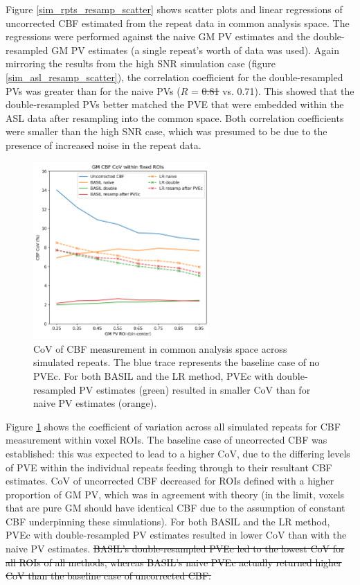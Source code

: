 \documentclass[12pt]{report}
\providecommand{\DIFaddtex}[1]{{\protect\color{blue}\uwave{#1}}} %
\providecommand{\DIFdeltex}[1]{{\protect\color{red}\sout{#1}}}                      %
\providecommand{\DIFaddbegin}{} %
\providecommand{\DIFaddend}{} %
\providecommand{\DIFdelbegin}{} %
\providecommand{\DIFdelend}{} %
\providecommand{\DIFadd}[1]{\texorpdfstring{\DIFaddtex{#1}}{#1}} %
\providecommand{\DIFdel}[1]{\texorpdfstring{\DIFdeltex{#1}}{}} %
\newcommand{\DIFscaledelfig}{0.5}
\newlength{\DIFdelgraphicswidth} %
\newlength{\DIFdelgraphicsheight} %
\newcommand{\DIFaddincludegraphics}[2][]{{\color{blue}\fbox{\DIFOincludegraphics[#1]{#2}}}} %
\newcommand{\DIFdelincludegraphics}[2][]{%
\sbox{\DIFdelgraphicsbox}{\DIFOincludegraphics[#1]{#2}}%
\settoboxwidth{\DIFdelgraphicswidth}{\DIFdelgraphicsbox} %
\settoboxtotalheight{\DIFdelgraphicsheight}{\DIFdelgraphicsbox} %
\scalebox{\DIFscaledelfig}{%
\parbox[b]{\DIFdelgraphicswidth}{\usebox{\DIFdelgraphicsbox}\\[-\baselineskip] \rule{\DIFdelgraphicswidth}{0em}}\llap{\resizebox{\DIFdelgraphicswidth}{\DIFdelgraphicsheight}{%
\setlength{\unitlength}{\DIFdelgraphicswidth}%
\begin{picture}(1,1)%
\thicklines\linethickness{2pt} %
{\color[rgb]{1,0,0}\put(0,0){\framebox(1,1){}}}%
{\color[rgb]{1,0,0}\put(0,0){\line( 1,1){1}}}%
{\color[rgb]{1,0,0}\put(0,1){\line(1,-1){1}}}%
\end{picture}%
}\hspace*{3pt}}} %
} %
\DeclareRobustCommand{\DIFaddbegin}{\DIFOaddbegin \let\includegraphics\DIFaddincludegraphics} %
\DeclareRobustCommand{\DIFaddend}{\DIFOaddend \let\includegraphics\DIFOincludegraphics} %
\DeclareRobustCommand{\DIFdelbegin}{\DIFOdelbegin \let\includegraphics\DIFdelincludegraphics} %
\DeclareRobustCommand{\DIFdelend}{\DIFOaddend \let\includegraphics\DIFOincludegraphics} %
\begin{document}
Figure \ref{sim_rpts_resamp_scatter} shows scatter plots and linear regressions of uncorrected CBF estimated from the repeat data in common analysis space. The regressions were performed against the naive GM PV estimates and the double-resampled GM PV estimates (a single repeat's worth of data was used). Again mirroring the results from the high SNR simulation case (figure \ref{sim_asl_resamp_scatter}), the correlation coefficient for the double-resampled PVs was greater than for the naive PVs ($R$ = \DIFdelbegin \DIFdel{0.81 }\DIFdelend \DIFaddbegin \DIFadd{0.86 }\DIFaddend vs. 0.71). This showed that the double-resampled PVs better matched the PVE that were embedded within the ASL data after resampling into the common space. Both correlation coefficients were smaller than the high SNR case, which was presumed to be due to the presence of increased noise in the repeat data. 


\begin{figure}[H]
\centering
\includegraphics[width = 0.6\textwidth]{sim_lowsnr_cov.png}
\caption{CoV of CBF measurement in common analysis space across simulated repeats. The blue trace represents the baseline case of no PVEc. For both BASIL and the LR method, PVEc with double-resampled PV estimates (green) resulted in smaller CoV than for naive PV estimates (orange).}
\label{sim_lowsnr_cov}
\end{figure}

Figure \ref{sim_lowsnr_cov} shows the coefficient of variation across all simulated repeats for CBF measurement within voxel ROIs. The baseline case of uncorrected CBF was established: this was expected to lead to a higher CoV, due to the differing levels of PVE within the individual repeats feeding through to their resultant CBF estimates. CoV of uncorrected CBF decreased for ROIs defined with a higher proportion of GM PV, which was in agreement with theory (in the limit, voxels that are pure GM should have identical CBF due to the assumption of constant CBF underpinning these simulations). For both BASIL and the LR method, PVEc with double-resampled PV estimates resulted in lower CoV than with the naive PV estimates.
\DIFdelbegin \DIFdel{BASIL's double-resampled PVEc led to the lowest CoV for all ROIs of all methods, whereas BASIL's naive PVEc actually returned higher CoV than the baseline case of uncorrected CBF. 
}\DIFdelend 
\end{document}
